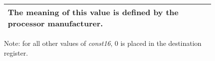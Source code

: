{\begin{figure}[ht]
\begin{center}
\begin{tabular}{|l|p{}|}
	The meaning of this value is defined by the processor
	manufacturer.  \\
\hline

\end{tabular}
\end{center}

Note:  for all other values of {\em const16}, 0 is placed in the
destination register.

\end{figure}


}


\renewcommand{\INSTexceptions}	{}
